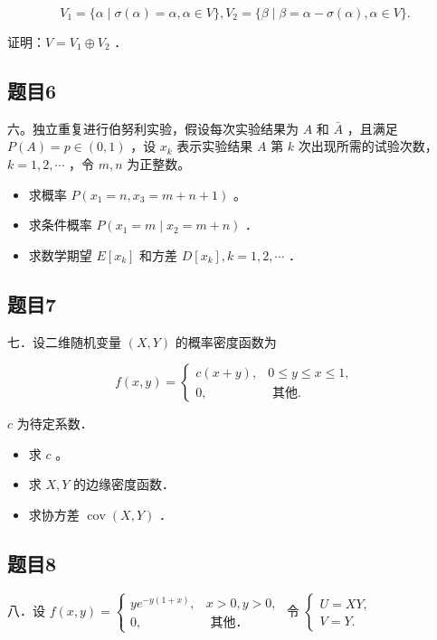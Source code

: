 \documentclass{article}
\begin{document}
\[
V_{1}=\{\alpha \mid \sigma(\alpha)=\alpha, \alpha \in V\}, V_{2}=\{\beta \mid \beta=\alpha-\sigma(\alpha), \alpha \in V\} .
\]

证明：\(V=V_{1} \oplus V_{2}\) ．

\subsection{题目6}
六。独立重复进行伯努利实验，假设每次实验结果为 \(A\) 和 \(\bar{A}\) ，且满足 \(P(A)=p \in(0,1)\) ，设 \(x_{k}\) 表示实验结果 \(A\) 第 \(k\) 次出现所需的试验次数，\(k=1,2, \cdots\) ，令 \(m, n\) 为正整数。

\begin{itemize}
  \item[（1）] 求概率 \(P\left(x_{1}=n, x_{3}=m+n+1\right)\) 。
  \item[（2）] 求条件概率 \(P\left(x_{1}=m \mid x_{2}=m+n\right)\) ．
  \item[（3）] 求数学期望 \(E\left[x_{k}\right]\) 和方差 \(D\left[x_{k}\right], k=1,2, \cdots\) ．
\end{itemize}

\subsection{题目7}
七．设二维随机变量 \((X, Y)\) 的概率密度函数为

\[
f(x, y)= \begin{cases}c(x+y), & 0 \leq y \leq x \leq 1, \\ 0, & \text { 其他. }\end{cases}
\]

\(c\) 为待定系数．

\begin{itemize}
  \item[（1）] 求 \(c\) 。
  \item[（2）] 求 \(X, Y\) 的边缘密度函数．
  \item[（3）] 求协方差 \(\operatorname{cov}(X, Y)\) ．
\end{itemize}

\subsection{题目8}
八．设 \(f(x, y)=\left\{\begin{array}{ll}y e^{-y(1+x)}, & x>0, y>0, \\ 0, & \text { 其他．}\end{array}\right.\) 令 \(\left\{\begin{array}{l}U=X Y, \\ V=Y .\end{array}\right.\)
\end{document}
